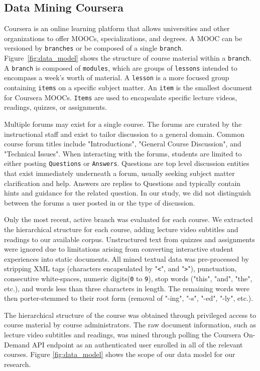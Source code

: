\documentclass[sigconf, anonymous]{acmart}
\begin{document}
\subsection{Data Mining Coursera}
Coursera is an online learning platform that allows universities and other organizations to offer MOOCs, specializations, and degrees.
A MOOC can be versioned by \texttt{branches} or be composed of a single \texttt{branch}.
Figure~\ref{fig:data_model} shows the structure of course material within a \texttt{branch}.
A \texttt{branch} is composed of \texttt{modules}, which are groups of \texttt{lessons} intended to encompass a week's worth of material.
A \texttt{lesson} is a more focused group containing \texttt{items} on a specific subject matter.
An \texttt{item} is the smallest document for Coursera MOOCs. \texttt{Items} are used to encapsulate specific lecture videos, readings, quizzes, or assignments.

Multiple forums may exist for a single course.
The forums are curated by the instructional staff and exist to tailor discussion to a general domain.
Common course forum titles include "Introductions", "General Course Discussion", and "Technical Issues".
When interacting with the forums, students are limited to either posting \texttt{Questions} or \texttt{Answers}.
Questions are top level discussion entities that exist immediately underneath a forum, usually seeking subject matter clarification and help.
Answers are replies to Questions and typically contain hints and guidance for the related question.
In our study, we did not distinguish between the forums a user posted in or the type of discussion.

Only the most recent, active branch was evaluated for each course.
We extracted the hierarchical structure for each course, adding lecture video subtitles and readings to our available corpus.
Unstructured text from quizzes and assignments were ignored due to limitations arising from converting interactive student experiences into static documents.
All mined textual data was pre-processed by stripping XML tags (characters encapsulated by "\texttt{<}", and "\texttt{>}"), punctuation, consecutive white-spaces, numeric digits(\texttt{0} to \texttt{9}), stop words ("this", "and", "the", etc.), and words less than three characters in length.
The remaining words were then porter-stemmed to their root form (removal of "-ing", "-s", "-ed", "-ly", etc.).

The hierarchical structure of the course was obtained through privileged access to course material by course administrators.
The raw document information, such as lecture video subtitles and readings, was mined through polling the Coursera On-Demand API endpoint as an authenticated user enrolled in all of the relevant courses.
Figure \ref{fig:data_model} shows the scope of our data model for our research.
\end{document}
